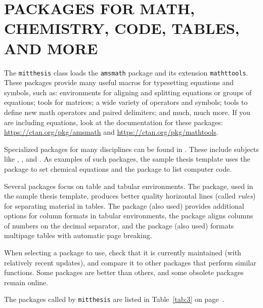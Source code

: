 \documentclass[11pt]{article}
\begin{document}
\section{PACKAGES FOR MATH, CHEMISTRY, CODE, TABLES, AND MORE}
The \texttt{mitthesis} class loads the \texttt{amsmath} package and its extension \texttt{mathttools}. These packages provide many useful macros for typesetting equations and symbols, such as: environments for aligning and splitting equations or groups of equations; tools for matrices; a wide variety of operators and symbols; tools to define new math operators and paired delimiters; and much, much more. If you are including equations, look at the documentation for these packages: \url{https://ctan.org/pkg/amsmath} and \url{https://ctan.org/pkg/mathtools}.

Specialized packages for many disciplines can be found in .  These include subjects like , , and .  As examples of such packages, the sample thesis template uses the package \texttt{} to set chemical equations and the package \texttt{} to list computer code.

Several packages focus on table and tabular environments.  The \texttt{} package, used in the sample thesis template, produces better quality horizontal lines (called \textit{rules}) for separating material in tables.  The \texttt{} package (also used) provides additional options for column formats in tabular environments, the \texttt{} package aligns columns of numbers on the decimal separator, and the \texttt{} package (also used) formats multipage tables with automatic page breaking.

When selecting a package to use, check that it is currently maintained (with relatively recent updates), and compare it to other packages that perform similar functions.  Some packages are better than others, and some obsolete packages remain online.

The packages called by \texttt{mitthesis} are listed in Table~\ref{tab:3} on page~\pageref{tab:3}.
\end{document}
